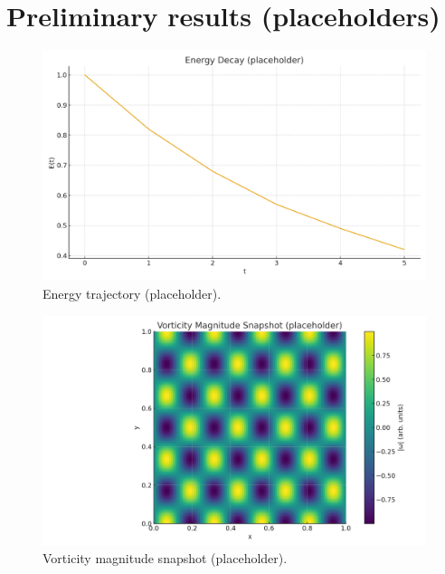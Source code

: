\section{Preliminary results (placeholders)}
\begin{figure}[t]\centering\includegraphics[width=.8\linewidth]{figures/energy_decay_placeholder.png}\caption{Energy trajectory (placeholder).}\end{figure}
\begin{figure}[t]\centering\includegraphics[width=.8\linewidth]{figures/vorticity_snapshot_placeholder.png}\caption{Vorticity magnitude snapshot (placeholder).}\end{figure}
